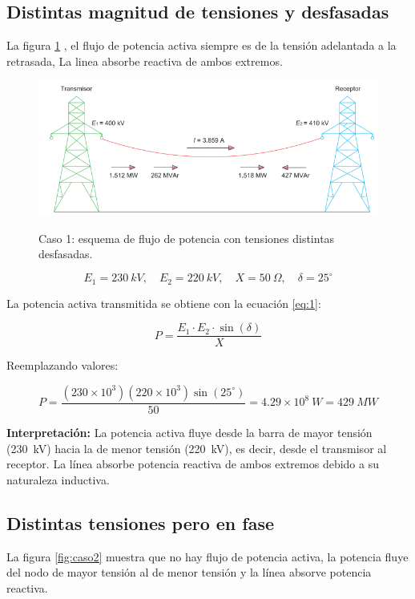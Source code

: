 \documentclass[a5paper]{book}%
\begin{document}
\subsection{Distintas magnitud de tensiones  y desfasadas}
La figura \ref{fig:caso1}  , el flujo de potencia activa siempre es de la tensión adelantada a la  retrasada, La linea absorbe reactiva de ambos extremos.


\begin{figure}[H]
	\centering
	\caption{Caso 1: esquema de flujo de potencia con tensiones distintas
		desfasadas.}
	\includegraphics[width=\linewidth]{caso1}
	\label{fig:caso1}
\end{figure}

\[
E_{1} = 230~kV, \quad E_{2} = 220~kV, \quad X = 50~\Omega, \quad \delta = 25^\circ
\]

La potencia activa transmitida se obtiene con la ecuación \ref{eq:1}:

\[
P = \dfrac{E_{1} \cdot E_{2} \cdot \sin(\delta)}{X}
\]

Reemplazando valores:

\[
P = \dfrac{(230 \times 10^{3}) (220 \times 10^{3}) \sin(25^\circ)}{50} = 4.29 \times 10^{8}~W = 429~MW
\]

\textbf{Interpretación:}  
La potencia activa fluye desde la barra de mayor tensión (230~kV) hacia la de menor tensión (220~kV), es decir, desde el transmisor al receptor.  
La línea absorbe potencia reactiva de ambos extremos debido a su naturaleza inductiva.



\subsection{Distintas tensiones pero en fase}

La figura \ref{fig:caso2} muestra que no hay flujo de potencia activa, la potencia fluye del nodo  de mayor tensión al de menor tensión y la línea absorve potencia reactiva.
\end{document}

